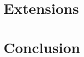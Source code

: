 \documentclass[12pt, onecolumn, draftclsnofoot]{IEEEtran}
\begin{document}
\ifdefined\JSAITREVIEW\else
\section{Extensions}\label{sec:extensions}

\fi

\section{Conclusion}\label{sec:conclusion}





\end{document}
